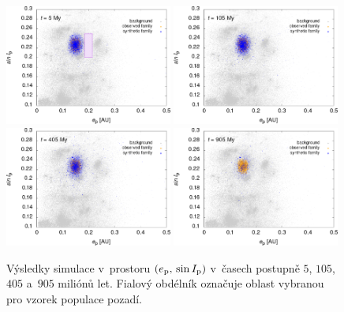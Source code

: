 \documentclass[A4paper, 12pt, oneside]{book}
\begin{document}
\immediate{}
\immediate{}
\immediate{}
\immediate{}
\begin{figure}
	\centering
	\includegraphics[width=0.49\textwidth]{obr/ei_5t.png}
	\includegraphics[width=0.49\textwidth]{obr/ei_105t.png}\\
	\includegraphics[width=0.49\textwidth]{obr/ei_405t.png}
	\includegraphics[width=0.49\textwidth]{obr/ei_905t.png}
	\caption{Výsledky simulace v~prostoru $(e_{\rm p},\,\sin I_{\rm p})$ v~časech postupně $5$, $105$, $405$ a~$905$ miliónů let. Fialový obdélník označuje oblast vybranou pro vzorek populace pozadí.} \label{fig:ei_sim}
\end{figure}
\end{document}
